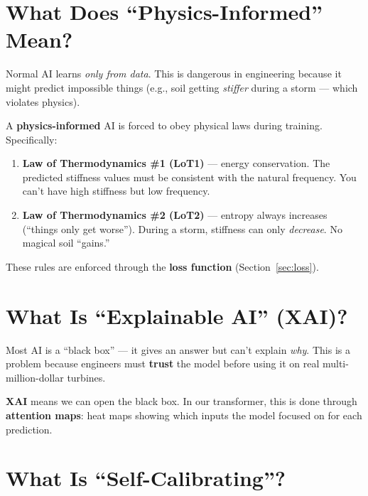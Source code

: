 \documentclass[11pt,a4paper]{article}
\begin{document}
\section{What Does ``Physics-Informed'' Mean?}

Normal AI learns \textit{only from data}.  This is dangerous in engineering
because it might predict impossible things (e.g., soil getting \textit{stiffer}
during a storm --- which violates physics).

A \textbf{physics-informed} AI is forced to obey physical laws during
training.  Specifically:

\begin{enumerate}
  \item \textbf{Law of Thermodynamics \#1 (LoT1)} --- energy conservation.
        The predicted stiffness values must be consistent with the natural
        frequency.  You can't have high stiffness but low frequency.

  \item \textbf{Law of Thermodynamics \#2 (LoT2)} --- entropy always
        increases (``things only get worse'').  During a storm, stiffness can
        only \textit{decrease}.  No magical soil ``gains.''
\end{enumerate}

These rules are enforced through the \textbf{loss function}
(Section~\ref{sec:loss}).

\section{What Is ``Explainable AI'' (XAI)?}

Most AI is a ``black box'' --- it gives an answer but can't explain \textit{why}.
This is a problem because engineers must \textbf{trust} the model before
using it on real multi-million-dollar turbines.

\textbf{XAI} means we can open the black box.  In our transformer, this is
done through \textbf{attention maps}: heat maps showing which inputs the model
focused on for each prediction.

\section{What Is ``Self-Calibrating''?}
\end{document}
